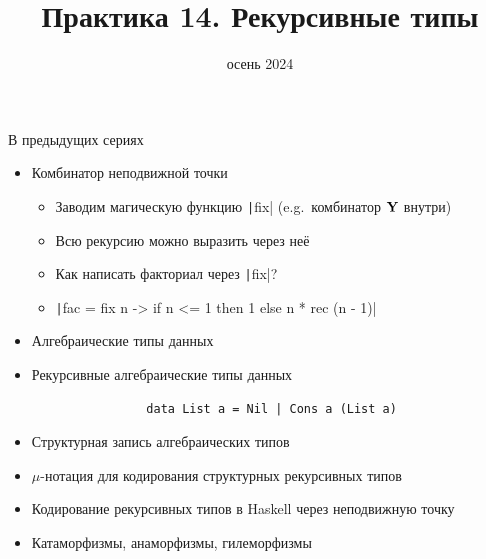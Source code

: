 
\newif\ifhandout




\title[14. Рекурсивные типы]{Практика 14. Рекурсивные типы}
\date{осень 2024}



    \setcounter{framenumber}{-1}
    \maketitle

    \begin{frame}[fragile]{В предыдущих сериях}
        \vspace{-0.5em}
        \begin{itemize}
            \item \pause Комбинатор неподвижной точки
            \begin{itemize}
                \item Заводим магическую функцию \texttt|fix| (e.g.\ комбинатор $\mathbf{Y}$ внутри)
                \item Всю рекурсию можно выразить через неё
                \item[\todo] Как написать факториал через \texttt|fix|?
                \item[\answer] \pause \texttt|fac = fix \rec n -> if n <= 1 then 1 else n * rec (n - 1)|
            \end{itemize}
            \item \pause Алгебраические типы данных
            \item Рекурсивные алгебраические типы данных
            \begin{verbatim}
                data List a = Nil | Cons a (List a)
            \end{verbatim}
            \item[\newtopic] \pause Структурная запись алгебраических типов
            \item[\newtopic] $\mu$-нотация для кодирования структурных рекурсивных типов
            \item[\newtopic] Кодирование рекурсивных типов в Haskell через неподвижную точку
            \item[\newtopic] Катаморфизмы, анаморфизмы, гилеморфизмы
        \end{itemize}
    \end{frame}

